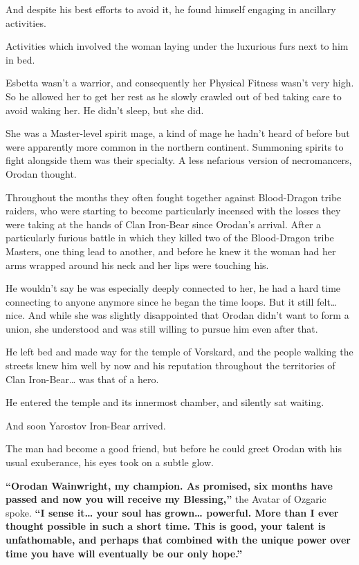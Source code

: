 \documentclass[a4paper,10pt]{book}
\begin{document}
And despite his best efforts to avoid it, he found himself engaging in ancillary activities.\par
Activities which involved the woman laying under the luxurious furs next to him in bed.\par
Esbetta wasn’t a warrior, and consequently her Physical Fitness wasn’t very high. So he allowed her to get her rest as he slowly crawled out of bed taking care to avoid waking her. He didn’t sleep, but she did.\par
She was a Master-level spirit mage, a kind of mage he hadn’t heard of before but were apparently more common in the northern continent. Summoning spirits to fight alongside them was their specialty. A less nefarious version of necromancers, Orodan thought.\par
Throughout the months they often fought together against Blood-Dragon tribe raiders, who were starting to become particularly incensed with the losses they were taking at the hands of Clan Iron-Bear since Orodan’s arrival. After a particularly furious battle in which they killed two of the Blood-Dragon tribe Masters, one thing lead to another, and before he knew it the woman had her arms wrapped around his neck and her lips were touching his.\par
He wouldn’t say he was especially deeply connected to her, he had a hard time connecting to anyone anymore since he began the time loops. But it still felt… nice. And while she was slightly disappointed that Orodan didn’t want to form a union, she understood and was still willing to pursue him even after that.\par
He left bed and made way for the temple of Vorskard, and the people walking the streets knew him well by now and his reputation throughout the territories of Clan Iron-Bear… was that of a hero.\par
He entered the temple and its innermost chamber, and silently sat waiting.\par
And soon Yarostov Iron-Bear arrived.\par
The man had become a good friend, but before he could greet Orodan with his usual exuberance, his eyes took on a subtle glow.\par
\textbf{“Orodan Wainwright, my champion. As promised, six months have passed and now you will receive my Blessing,” }the Avatar of Ozgaric spoke. \textbf{“I sense it… your soul has grown… powerful. More than I ever thought possible in such a short time. This is good, your talent is unfathomable, and perhaps that combined with the unique power over time you have will eventually be our only hope.”}\par
\end{document}
